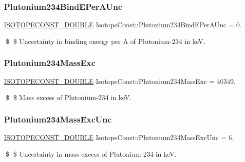 \subsubsection{\texorpdfstring{Plutonium234\+Bind\+E\+Per\+A\+Unc}{Plutonium234BindEPerAUnc}}
{\footnotesize\ttfamily \mbox{\hyperlink{group___isotope_const-_macros_ga8f45a7272ce02c0b4c65c44636ed719a}{I\+S\+O\+T\+O\+P\+E\+C\+O\+N\+S\+T\+\_\+\+D\+O\+U\+B\+LE}} Isotope\+Const\+::\+Plutonium234\+Bind\+E\+Per\+A\+Unc = 0.}

\$ \$ Uncertainty in binding energy per A of Plutonium-\/234 in keV. \mbox{\label{group___isotope_const-_plutonium-_pu234_gabefa0634ad2f6861d7a156d2fa74ba4c}} 
\subsubsection{\texorpdfstring{Plutonium234\+Mass\+Exc}{Plutonium234MassExc}}
{\footnotesize\ttfamily \mbox{\hyperlink{group___isotope_const-_macros_ga8f45a7272ce02c0b4c65c44636ed719a}{I\+S\+O\+T\+O\+P\+E\+C\+O\+N\+S\+T\+\_\+\+D\+O\+U\+B\+LE}} Isotope\+Const\+::\+Plutonium234\+Mass\+Exc = 40349.}

\$ \$ Mass excess of Plutonium-\/234 in keV. \mbox{\label{group___isotope_const-_plutonium-_pu234_ga6198ab6b4402b889d36f1cd80f3251d0}} 
\subsubsection{\texorpdfstring{Plutonium234\+Mass\+Exc\+Unc}{Plutonium234MassExcUnc}}
{\footnotesize\ttfamily \mbox{\hyperlink{group___isotope_const-_macros_ga8f45a7272ce02c0b4c65c44636ed719a}{I\+S\+O\+T\+O\+P\+E\+C\+O\+N\+S\+T\+\_\+\+D\+O\+U\+B\+LE}} Isotope\+Const\+::\+Plutonium234\+Mass\+Exc\+Unc = 6.}

\$ \$ Uncertainty in mass excess of Plutonium-\/234 in keV. \mbox{\label{group___isotope_const-_plutonium-_pu234_ga95052558585c570a3fd1d061cbd0d53b}} 
